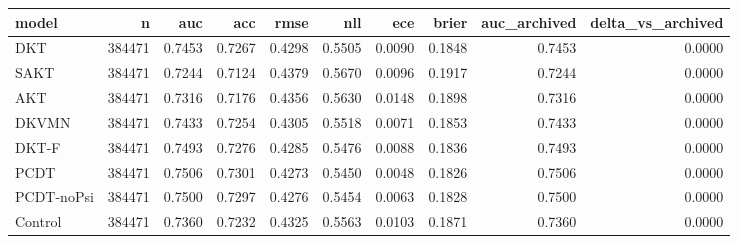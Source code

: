 \begin{tabular}{lrrrrrrrrr}
\toprule
model & n & auc & acc & rmse & nll & ece & brier & auc\_archived & delta\_vs\_archived \\
\midrule
DKT & 384471 & 0.7453 & 0.7267 & 0.4298 & 0.5505 & 0.0090 & 0.1848 & 0.7453 & 0.0000 \\
SAKT & 384471 & 0.7244 & 0.7124 & 0.4379 & 0.5670 & 0.0096 & 0.1917 & 0.7244 & 0.0000 \\
AKT & 384471 & 0.7316 & 0.7176 & 0.4356 & 0.5630 & 0.0148 & 0.1898 & 0.7316 & 0.0000 \\
DKVMN & 384471 & 0.7433 & 0.7254 & 0.4305 & 0.5518 & 0.0071 & 0.1853 & 0.7433 & 0.0000 \\
DKT-F & 384471 & 0.7493 & 0.7276 & 0.4285 & 0.5476 & 0.0088 & 0.1836 & 0.7493 & 0.0000 \\
PCDT & 384471 & 0.7506 & 0.7301 & 0.4273 & 0.5450 & 0.0048 & 0.1826 & 0.7506 & 0.0000 \\
PCDT-noPsi & 384471 & 0.7500 & 0.7297 & 0.4276 & 0.5454 & 0.0063 & 0.1828 & 0.7500 & 0.0000 \\
Control & 384471 & 0.7360 & 0.7232 & 0.4325 & 0.5563 & 0.0103 & 0.1871 & 0.7360 & 0.0000 \\
\bottomrule
\end{tabular}
